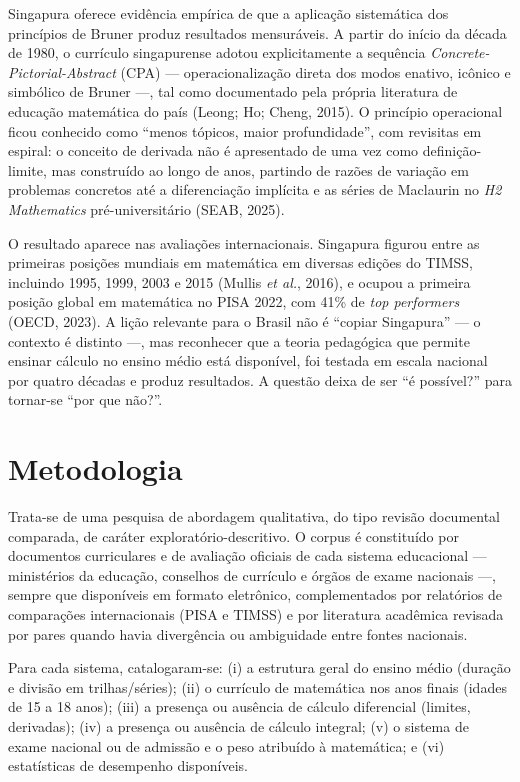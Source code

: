 \documentclass[12pt,a4paper,oneside]{article}
\begin{document}
Singapura oferece evidência empírica de que a aplicação sistemática dos
princípios de Bruner produz resultados mensuráveis. A partir do início
da década de 1980, o currículo singapurense adotou explicitamente a
sequência \emph{Concrete-Pictorial-Abstract} (CPA) --- operacionalização
direta dos modos enativo, icônico e simbólico de Bruner ---, tal como
documentado pela própria literatura de educação matemática do país
(Leong; Ho; Cheng, 2015). O princípio operacional ficou conhecido como
``menos tópicos, maior profundidade'', com revisitas em espiral: o
conceito de derivada não é apresentado de uma vez como definição-limite,
mas construído ao longo de anos, partindo de razões de variação em
problemas concretos até a diferenciação implícita e as séries de
Maclaurin no \emph{H2 Mathematics} pré-universitário (SEAB, 2025).

O resultado aparece nas avaliações internacionais. Singapura figurou
entre as primeiras posições mundiais em matemática em diversas edições do
TIMSS, incluindo 1995, 1999, 2003 e 2015 (Mullis \emph{et al.}, 2016), e
ocupou a primeira posição global em matemática no PISA 2022, com 41\% de
\emph{top performers} (OECD, 2023). A lição relevante para o Brasil não é
``copiar Singapura'' --- o contexto é distinto ---, mas reconhecer que a
teoria pedagógica que permite ensinar cálculo no ensino médio está
disponível, foi testada em escala nacional por quatro décadas e produz
resultados. A questão deixa de ser ``é possível?'' para tornar-se ``por
que não?''.

\section{Metodologia}

Trata-se de uma pesquisa de abordagem qualitativa, do tipo revisão
documental comparada, de caráter exploratório-descritivo. O corpus é
constituído por documentos curriculares e de avaliação oficiais de cada
sistema educacional --- ministérios da educação, conselhos de currículo e
órgãos de exame nacionais ---, sempre que disponíveis em formato
eletrônico, complementados por relatórios de comparações internacionais
(PISA e TIMSS) e por literatura acadêmica revisada por pares quando havia
divergência ou ambiguidade entre fontes nacionais.

Para cada sistema, catalogaram-se: (i) a estrutura geral do ensino médio
(duração e divisão em trilhas/séries); (ii) o currículo de matemática nos
anos finais (idades de 15 a 18 anos); (iii) a presença ou ausência de
cálculo diferencial (limites, derivadas); (iv) a presença ou ausência de
cálculo integral; (v) o sistema de exame nacional ou de admissão e o peso
atribuído à matemática; e (vi) estatísticas de desempenho disponíveis.
\end{document}
